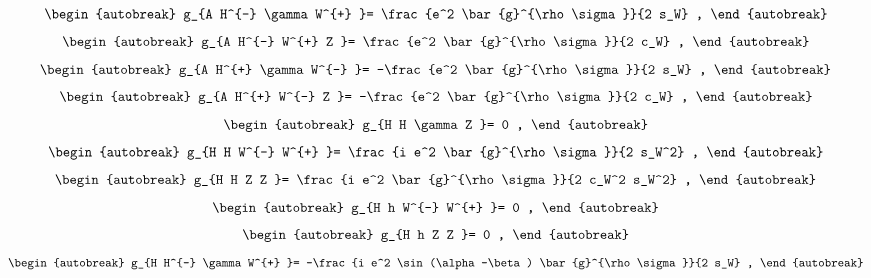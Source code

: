 \begin{align}
\begin{autobreak}
g_{A H^{-} \gamma W^{+} }=
	\frac{e^2 \bar{g}^{\rho \sigma }}{2 s_W}
	,
\end{autobreak}
\end{align}
\begin{align}
\begin{autobreak}
g_{A H^{-} W^{+} Z }=
	\frac{e^2 \bar{g}^{\rho \sigma }}{2 c_W}
	,
\end{autobreak}
\end{align}
\begin{align}
\begin{autobreak}
g_{A H^{+} \gamma W^{-} }=
	-\frac{e^2 \bar{g}^{\rho \sigma }}{2 s_W}
	,
\end{autobreak}
\end{align}
\begin{align}
\begin{autobreak}
g_{A H^{+} W^{-} Z }=
	-\frac{e^2 \bar{g}^{\rho \sigma }}{2 c_W}
	,
\end{autobreak}
\end{align}
\begin{align}
\begin{autobreak}
g_{H H \gamma Z }=
	0
	,
\end{autobreak}
\end{align}
\begin{align}
\begin{autobreak}
g_{H H W^{-} W^{+} }=
	\frac{i e^2 \bar{g}^{\rho \sigma }}{2 s_W^2}
	,
\end{autobreak}
\end{align}
\begin{align}
\begin{autobreak}
g_{H H Z Z }=
	\frac{i e^2 \bar{g}^{\rho \sigma }}{2 c_W^2 s_W^2}
	,
\end{autobreak}
\end{align}
\begin{align}
\begin{autobreak}
g_{H h W^{-} W^{+} }=
	0
	,
\end{autobreak}
\end{align}
\begin{align}
\begin{autobreak}
g_{H h Z Z }=
	0
	,
\end{autobreak}
\end{align}
\begin{align}
\begin{autobreak}
g_{H H^{-} \gamma W^{+} }=
	-\frac{i e^2 \sin (\alpha -\beta ) \bar{g}^{\rho \sigma }}{2 s_W}
	,
\end{autobreak}
\end{align}
